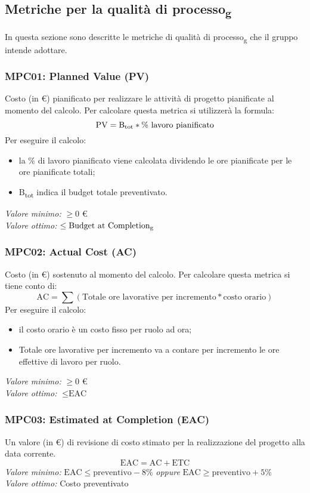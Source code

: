 \subsection{Metriche per la qualità di processo\textsubscript{g}}
In questa sezione sono descritte le metriche di qualità di processo\textsubscript{g} che il gruppo intende adottare.

\subsubsection{MPC01: Planned Value (PV)}
Costo (in \euro) pianificato per realizzare le attività di progetto pianificate al momento del calcolo.
Per calcolare questa metrica si utilizzerà la formula:
\begin{equation*}
\text{PV}=\text{B}\textsubscript{tot} * \%\text{ lavoro pianificato}
\end{equation*}
\noindent Per eseguire il calcolo:
 \begin{itemize}
 \item la \% di lavoro pianificato viene calcolata dividendo le ore pianificate per le ore pianificate totali;
\item B\textsubscript{tot} indica il budget totale preventivato.
 \end{itemize}
\textit{Valore minimo:} $\ge 0$ \euro\\
\textit{Valore ottimo:}	$\le \text{Budget at Completion\textsubscript{g}}$
\subsubsection{MPC02: Actual Cost (AC)}
Costo (in \euro) sostenuto al momento del calcolo.
Per calcolare questa metrica si tiene conto di:
\begin{equation*}
\text{AC}=\sum (\text{Totale ore lavorative per incremento}*\text{costo orario})
\end{equation*}
\noindent Per eseguire il calcolo:
 \begin{itemize}
 \item il costo orario è un costo fisso per ruolo ad ora;
 \item Totale ore lavorative per incremento va a contare per incremento le ore effettive di lavoro per ruolo.
 \end{itemize}
\textit{Valore minimo:} $\ge 0$ \euro\\
\textit{Valore ottimo:} $\le \text{EAC}$
\subsubsection{MPC03: Estimated at Completion (EAC)}
Un valore (in \euro) di revisione di costo stimato per la realizzazione del progetto alla data corrente.
\begin{equation*}
\text{EAC}=\text{AC}+\text{ETC}
\end{equation*}
\textit{Valore minimo:} 
$ \text{EAC} \le \text{preventivo} -8\% $ \textit{oppure} $ \text{EAC} \ge \text{preventivo} +5\% $\\
\textit{Valore ottimo:} Costo preventivato
